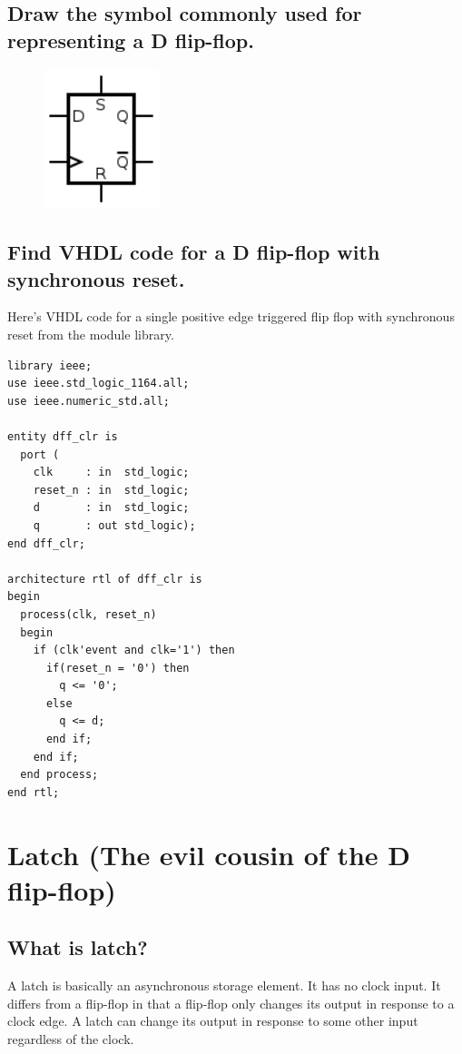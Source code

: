 \documentclass{article}
\begin{document}
\subsection{Draw the symbol commonly used for representing a D
  flip-flop.}
\begin{figure}[hbp]
  \includegraphics[width=0.3\textwidth]{images/d-flip-flop}
\end{figure}

\subsection{Find VHDL code for a D flip-flop with synchronous reset.}
Here's VHDL code for a single positive edge triggered flip flop with
synchronous reset from the module library.

\lstset{
  language=VHDL,
  basicstyle=\small\sffamily,
  numbers=left,
  numberstyle=\tiny,
  frame=tb,
  columns=fullflexible,
  showstringspaces=false
}

\begin{lstlisting}
library ieee;
use ieee.std_logic_1164.all;
use ieee.numeric_std.all;

entity dff_clr is
  port (
    clk     : in  std_logic;
    reset_n : in  std_logic;
    d       : in  std_logic;
    q       : out std_logic);
end dff_clr;

architecture rtl of dff_clr is
begin
  process(clk, reset_n)
  begin
    if (clk'event and clk='1') then
      if(reset_n = '0') then
        q <= '0';
      else
        q <= d;
      end if;
    end if;
  end process;
end rtl;
\end{lstlisting}

\section{Latch (The evil cousin of the D flip-flop)}
\subsection{What is latch?}
A latch is basically an asynchronous storage element. It has no clock
input. It differs from a flip-flop in that a flip-flop only changes
its output in response to a clock edge. A latch can change its output
in response to some other input regardless of the clock.
\end{document}
